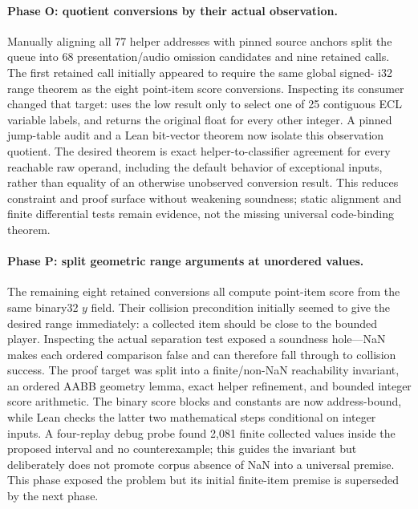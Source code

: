 \paragraph{Phase O: quotient conversions by their actual observation.}
Manually aligning all 77 helper addresses with pinned source anchors split the
queue into 68 presentation/audio omission candidates and nine retained calls.
The first retained call initially appeared to require the same global signed-
i32 range theorem as the eight point-item score conversions.  Inspecting its
consumer changed that target:  uses the low result only to
select one of 25 contiguous ECL variable labels, and returns the original float
for every other integer.  A pinned jump-table audit and a Lean bit-vector
theorem now isolate this observation quotient.  The desired theorem is exact
helper-to-classifier agreement for every reachable raw operand, including the
default behavior of exceptional inputs, rather than equality of an otherwise
unobserved conversion result.  This reduces constraint and proof surface
without weakening soundness; static alignment and finite differential tests
remain evidence, not the missing universal code-binding theorem.

\paragraph{Phase P: split geometric range arguments at unordered values.}
The remaining eight retained conversions all compute point-item score from the
same binary32 $y$ field.  Their collision precondition initially seemed to
give the desired range immediately: a collected item should be close to the
bounded player.  Inspecting the actual separation test exposed a soundness
hole---NaN makes each ordered comparison false and can therefore fall through
to collision success.  The proof target was split into a finite/non-NaN
reachability invariant, an ordered AABB geometry lemma, exact helper
refinement, and bounded integer score arithmetic.  The binary score blocks and
constants are now address-bound, while Lean checks the latter two mathematical
steps conditional on integer inputs.  A four-replay debug probe found 2,081
finite collected values inside the proposed interval and no counterexample;
this guides the invariant but deliberately does not promote corpus absence of
NaN into a universal premise.  This phase exposed the problem but its initial
finite-item premise is superseded by the next phase.

